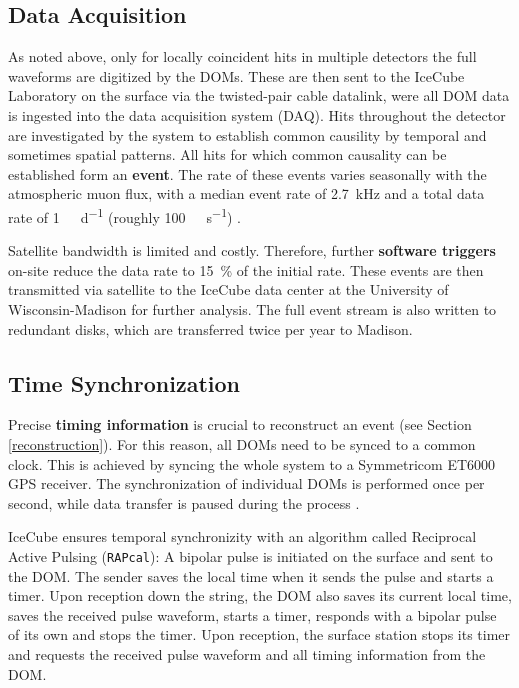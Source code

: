 \subsection{Data Acquisition}\label{data_acquisition}
As noted above, only for locally coincident hits in multiple detectors the full waveforms are digitized by the DOMs. These are then sent to the IceCube Laboratory on the surface via the twisted-pair cable datalink, were all DOM data is ingested into the data acquisition system (DAQ). Hits throughout the detector are investigated by the system to establish common causility by temporal and sometimes spatial patterns. All hits for which common causality can be established form an \textbf{event}. The rate of these events varies seasonally with the atmospheric muon flux, with a median event rate of \SI{2.7}{\kilo\Hz} and a total data rate of \SI{1}{\tera\byte\per\day} (roughly \SI{100}{\mega\bit\per\second}) \cite{Aartsen2017}.

Satellite bandwidth is limited and costly. Therefore, further \textbf{software triggers} on-site reduce the data rate to \SI{15}{\percent} of the initial rate. These events are then transmitted via satellite to the IceCube data center at the University of Wisconsin-Madison for further analysis. The full event stream is also written to redundant disks, which are transferred twice per year to Madison.

\subsection{Time Synchronization}
Precise \textbf{timing information} is crucial to reconstruct an event (see Section \ref{reconstruction}). For this reason, all DOMs need to be synced to a common clock. This is achieved by syncing the whole system to a Symmetricom ET6000 GPS receiver. The synchronization of individual DOMs is performed once per second, while data transfer is paused during the process .

IceCube ensures temporal synchronizity with an algorithm called Reciprocal Active Pulsing (\texttt{RAPcal}): A bipolar pulse is initiated on the surface and sent to the DOM. The sender saves the local time when it sends the pulse and starts a timer. Upon reception down the string, the DOM also saves its current local time, saves the received pulse waveform, starts a timer, responds with a bipolar pulse of its own and stops the timer. Upon reception, the surface station stops its timer and requests the received pulse waveform and all timing information from the DOM.

